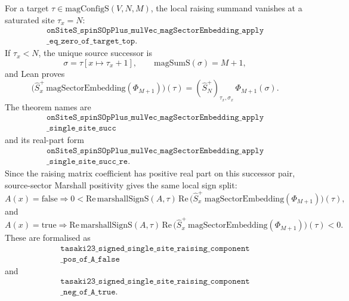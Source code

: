 \documentclass[a4paper,11pt]{article}
\begin{document}
For a target \(\tau\in\mathrm{magConfigS}(V,N,M)\), the local
raising summand vanishes at a saturated site \(\tau_x=N\):
\[
\begin{gathered}
\texttt{onSiteS\_spinSOpPlus\_mulVec\_magSectorEmbedding\_apply}\\
\texttt{\_eq\_zero\_of\_target\_top}.
\end{gathered}
\]
If \(\tau_x<N\), the unique source successor is
\[
  \sigma = \tau[x \mapsto \tau_x+1],
  \qquad
  \mathrm{magSumS}(\sigma)=M+1,
\]
and Lean proves
\[
  \bigl(\hat S^+_x\,\mathrm{magSectorEmbedding}(\Phi_{M+1})\bigr)(\tau)
  =
  (\hat S^+_N)_{\tau_x,\sigma_x}\,\Phi_{M+1}(\sigma).
\]
The theorem names are
\[
\begin{gathered}
\texttt{onSiteS\_spinSOpPlus\_mulVec\_magSectorEmbedding\_apply}\\
\texttt{\_single\_site\_succ}
\end{gathered}
\]
and its real-part form
\[
\begin{gathered}
\texttt{onSiteS\_spinSOpPlus\_mulVec\_magSectorEmbedding\_apply}\\
\texttt{\_single\_site\_succ\_re}.
\end{gathered}
\]
Since the raising matrix coefficient has positive real part on this
successor pair, source-sector Marshall positivity gives the same local
sign split:
\[
  A(x)=\mathrm{false}
  \Rightarrow
  0 <
  \mathrm{Re}\,\mathrm{marshallSignS}(A,\tau)\,
  \mathrm{Re}\,
  \bigl(\hat S^+_x\,\mathrm{magSectorEmbedding}(\Phi_{M+1})\bigr)(\tau),
\]
and
\[
  A(x)=\mathrm{true}
  \Rightarrow
  \mathrm{Re}\,\mathrm{marshallSignS}(A,\tau)\,
  \mathrm{Re}\,
  \bigl(\hat S^+_x\,\mathrm{magSectorEmbedding}(\Phi_{M+1})\bigr)(\tau)
  < 0 .
\]
These are formalised as
\[
\begin{gathered}
\texttt{tasaki23\_signed\_single\_site\_raising\_component}\\
\texttt{\_pos\_of\_A\_false}
\end{gathered}
\]
and
\[
\begin{gathered}
\texttt{tasaki23\_signed\_single\_site\_raising\_component}\\
\texttt{\_neg\_of\_A\_true}.
\end{gathered}
\]
\end{document}

